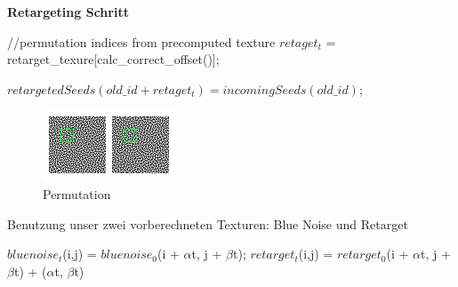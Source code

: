 \begin{algorithm}[H]
    \caption{\textbf{Retargeting Schritt}}
    \begin{algorithmic}[1]
        \State //permutation indices from precomputed texture
        \State $retaget_{t}$ = retarget\_texure[calc\_correct\_offset()];
        
        \State $retargetedSeeds(old\_id + retaget_{t}) = incomingSeeds(old\_id);$
        
    \end{algorithmic}
    \label{alg:retargetingAlg}
\end{algorithm}

\begin{figure}[H]\label{pic:Permutation}
    \centering
    \includegraphics[width=0.5\linewidth]{content/simulatedAnnealing/Bilder/Permutation.png}
    \caption{Permutation}
\end{figure}

\begin{algorithm}[H]
    \caption{Benutzung unser zwei vorberechneten Texturen: Blue Noise und Retarget}
    \begin{algorithmic}[1]
        \State $bluenoise_{t}$(i,j) = $bluenoise_{0}$(i + $\alpha$t, j + $\beta$t); 
        \State $retarget_{t}$(i,j) = $retarget_{0}$(i + $\alpha$t, j + $\beta$t) + ($\alpha$t, $\beta$t)
    \end{algorithmic}
    \label{alg:Benutzung vorberechneter Texturen}
\end{algorithm}

